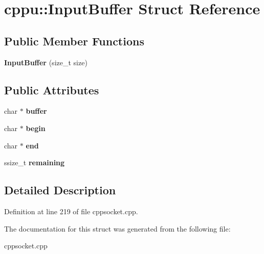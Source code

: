 \hypertarget{structcppu_1_1_input_buffer}{}\section{cppu\+:\+:Input\+Buffer Struct Reference}
\label{structcppu_1_1_input_buffer}
\subsection*{Public Member Functions}
\begin{DoxyCompactItemize}
\item 
\mbox{\label{structcppu_1_1_input_buffer_ac50e17e3cfb76a2983e5e3d4558b8144}} 
{\bfseries Input\+Buffer} (size\+\_\+t size)
\end{DoxyCompactItemize}
\subsection*{Public Attributes}
\begin{DoxyCompactItemize}
\item 
\mbox{\label{structcppu_1_1_input_buffer_a85138068e2e10731e46784b1552bc354}} 
char $\ast$ {\bfseries buffer}
\item 
\mbox{\label{structcppu_1_1_input_buffer_adbd6fb30fe51a192c9bbba6333016f31}} 
char $\ast$ {\bfseries begin}
\item 
\mbox{\label{structcppu_1_1_input_buffer_ac9fb4f51a6db191e71976fcda20237c0}} 
char $\ast$ {\bfseries end}
\item 
\mbox{\label{structcppu_1_1_input_buffer_a646b547733665524fa8b5de6b093ab11}} 
ssize\+\_\+t {\bfseries remaining}
\end{DoxyCompactItemize}


\subsection{Detailed Description}


Definition at line 219 of file cppsocket.\+cpp.



The documentation for this struct was generated from the following file\+:\begin{DoxyCompactItemize}
\item 
cppsocket.\+cpp\end{DoxyCompactItemize}
